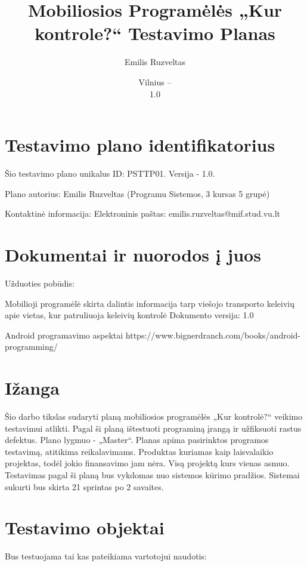 \documentclass{VUMIFPSkursinis}
\title{Mobiliosios Programėlės „Kur kontrole?“ Testavimo Planas}
\author{Emilis Ruzveltas}
\date{Vilnius – \the\year\\ 1.0}
\begin{document}
\maketitle

\tableofcontents
{}

\section{Testavimo plano identifikatorius}

Šio testavimo plano unikalus ID: PSTTP01.  Versija - 1.0.

Plano autorius: 
Emilis Ruzveltas (Programu Sistemos, 3 kursas 5 grupė)

Kontaktinė informacija:
Elektroninis paštas: emilis.ruzveltas@mif.stud.vu.lt

\section{Dokumentai ir nuorodos į juos}

Užduoties pobūdis:

Mobilioji programėlė skirta dalintis informacija tarp viešojo transporto keleivių apie vietas, kur patruliuoja keleivių kontrolė
Dokumento versija: 1.0

Android programavimo aspektai
https://www.bignerdranch.com/books/android-programming/

\section{Ižanga}

Šio darbo tikslas sudaryti planą mobiliosios programėlės „Kur kontrolė?“ veikimo testavimui atlikti.
Pagal ši planą ištestuoti programiną įrangą ir užfiksuoti rastus defektus.
Plano lygmuo - „Master“. Planas apima pasirinktos programos testavimą, atitikima reikalavimams. 
Produktas kuriamas kaip laisvalaikio projektas, todėl jokio finansavimo jam nėra. Visą projektą kurs vienas asmuo.
Testavimas pagal ši planą bus vykdomas nuo sistemos kūrimo pradžios. Sistemai sukurti bus skirta 21 sprintas po 2 savaites.


\section{Testavimo objektai}

Bus testuojama tai kas pateikiama vartotojui naudotis:
\end{document}
